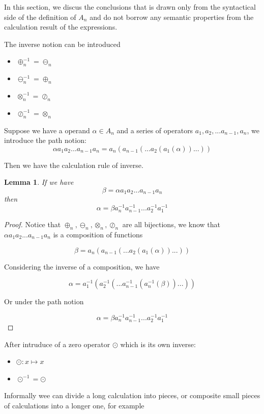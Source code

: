 \documentclass{article}
\newtheorem{lemma}{Lemma}
\begin{document}
In this section, we discus the conclusions that is drawn only from the syntactical side of the definition of $A_n$ and
do not borrow any semantic properties from the calculation result of the expressions.

The inverse notion can be introduced
\begin{itemize}
    \item $\oplus_n^{-1} = \ominus_n$
    \item $\ominus_n^{-1} = \oplus_n$
    \item $\otimes_n^{-1} = \oslash_n$
    \item $\oslash_n^{-1} = \otimes_n$
\end{itemize}

Suppose we have a operand $\alpha \in A_n $ and a series of operators $a_1, a_2, ... a_{n-1}, a_n$,
we introduce the path notion:
$$\alpha a_1 a_2 ... a_{n-1} a_n = a_n( a_{n-1}( ... a_2( a_1(\alpha) ) ... ) )$$

Then we have the calculation rule of inverse.

\begin{lemma}
\label{lemma:inverserule}
If we have
$$\beta = \alpha a_1 a_2 ... a_{n-1} a_n$$
then
$$\alpha = \beta a_n^{-1} a_{n-1}^{-1} ... a_2^{-1} a_1^{-1}$$
\end{lemma}

\begin{proof}
Notice that $\oplus_n, \ominus_n, \otimes_n, \oslash_n$ are all bijections, we know that $\alpha a_1 a_2 ... a_{n-1} a_n$ is a composition of functions

$$\beta = a_n( a_{n-1}( ... a_2( a_1(\alpha) ) ... ) )$$

Considering the inverse of a composition, we have

$$\alpha = a_1^{-1}( a_2^{-1}( ... a_{n-1}^{-1}( a_n^{-1}(\beta) ) ... ) )$$

Or under the path notion

$$\alpha = \beta a_n^{-1} a_{n-1}^{-1} ... a_2^{-1} a_1^{-1}$$

\qedhere
\end{proof}

After intruduce of a zero operator $\odot$ which is its own inverse:
\begin{itemize}
    \item $\odot: x \mapsto x$
    \item $\odot^{-1} = \odot$
\end{itemize}

Informally wee can divide a long calculation into pieces, or composite small pieces of calculations into a longer one,
for example
\end{document}
